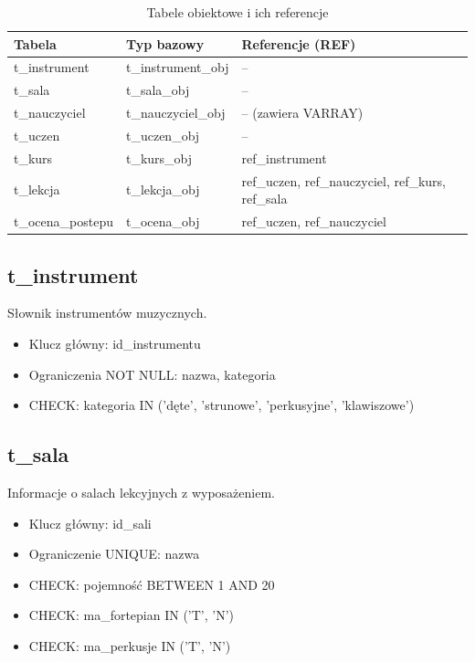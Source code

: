 \documentclass[12pt,a4paper]{article}
\begin{document}
\begin{table}[h]
\centering
\begin{tabular}{|l|l|l|}
\hline
\textbf{Tabela} & \textbf{Typ bazowy} & \textbf{Referencje (REF)} \\
\hline
t\_instrument & t\_instrument\_obj & -- \\
t\_sala & t\_sala\_obj & -- \\
t\_nauczyciel & t\_nauczyciel\_obj & -- (zawiera VARRAY) \\
t\_uczen & t\_uczen\_obj & -- \\
t\_kurs & t\_kurs\_obj & ref\_instrument \\
t\_lekcja & t\_lekcja\_obj & ref\_uczen, ref\_nauczyciel, ref\_kurs, ref\_sala \\
t\_ocena\_postepu & t\_ocena\_obj & ref\_uczen, ref\_nauczyciel \\
\hline
\end{tabular}
\caption{Tabele obiektowe i ich referencje}
\end{table}

\subsection{t\_instrument}

Słownik instrumentów muzycznych.

\begin{itemize}[nosep]
    \item Klucz główny: id\_instrumentu
    \item Ograniczenia NOT NULL: nazwa, kategoria
    \item CHECK: kategoria IN ('dęte', 'strunowe', 'perkusyjne', 'klawiszowe')
\end{itemize}

\subsection{t\_sala}

Informacje o salach lekcyjnych z wyposażeniem.

\begin{itemize}[nosep]
    \item Klucz główny: id\_sali
    \item Ograniczenie UNIQUE: nazwa
    \item CHECK: pojemność BETWEEN 1 AND 20
    \item CHECK: ma\_fortepian IN ('T', 'N')
    \item CHECK: ma\_perkusje IN ('T', 'N')
\end{itemize}
\end{document}
